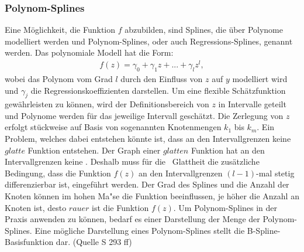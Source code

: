\subsubsection{Polynom-Splines}
	Eine Möglichkeit, die Funktion $f$ abzubilden, sind Splines, die über Polynome modelliert werden und Polynom-Splines, oder auch Regressions-Splines, genannt werden. Das polynomiale Modell hat die Form: 
\begin{align}
f(z)=\gamma_{0}+\gamma_{1}z+...+\gamma_{l}z^l,
\end{align}
wobei das Polynom vom Grad $l$ durch den Einfluss von $z$ auf $y$ modelliert wird und $\gamma_{j}$ die Regressionskoeffizienten darstellen. Um eine flexible Schätzfunktion gewährleisten zu können, wird der Definitionsbereich von $z$ in Intervalle geteilt und Polynome werden für das jeweilige Intervall geschätzt. Die Zerlegung von $z$ erfolgt stückweise auf Basis von sogenannten Knotenmengen $k_{1}$ bis $k_{m}$.  Ein Problem, welches dabei entstehen könnte ist, dass an den Intervallgrenzen keine $glatte$ Funktion entstehen. Der Graph einer $glatten$ Funktion hat an den Intervallgrenzen keine . Deshalb muss für die \grqq ~Glattheit die zusätzliche Bedingung, dass die Funktion $f(z)$ an den Intervallgrenzen $(l-1)$-mal stetig differenzierbar ist, eingeführt werden. Der Grad des Splines und die Anzahl der Knoten können im hohen Ma"se die Funktion beeinflussen, je höher die Anzahl an Knoten ist, desto $rauer$ ist die Funktion $f(z)$. Um Polynom-Splines in der Praxis anwenden zu können, bedarf es einer Darstellung der Menge der Polynom-Splines. Eine mögliche Darstellung eines Polynom-Splines stellt die B-Spline-Basisfunktion dar. (Quelle S 293 ff)

